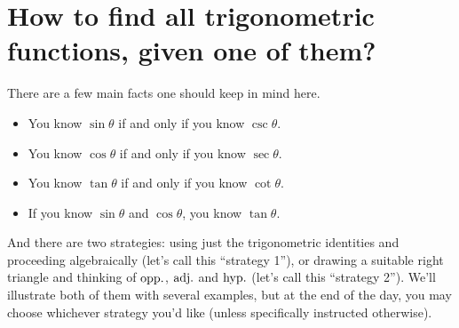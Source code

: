 \documentclass{ximera}
\begin{document}
\section{How to find all trigonometric functions, given one of them?}

There are a few main facts one should keep in mind here.
\begin{itemize}
\item You know $\sin\theta$ if and only if you know $\csc\theta$.
\item You know $\cos\theta$ if and only if you know $\sec\theta$.
\item You know $\tan\theta$ if and only if you know $\cot\theta$.
\item If you know $\sin\theta$ and $\cos\theta$, you know $\tan\theta$.
\end{itemize}

And there are two strategies: using just the trigonometric identities and proceeding algebraically (let's call this ``strategy 1''), or drawing a suitable right triangle and thinking of ${\rm opp.}$, ${\rm adj.}$ and ${\rm hyp.}$ (let's call this ``strategy 2''). We'll illustrate both of them with several examples, but at the end of the day, you may choose whichever strategy you'd like (unless specifically instructed otherwise).
\end{document}
